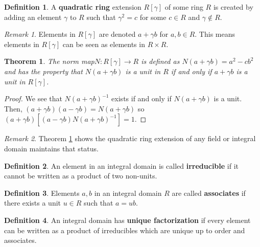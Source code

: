 \documentclass[
    parskip=half,
    toc=flat,
    toc=sectionentrydotfill,
]{scrartcl}  %
\theoremstyle{definition}
\newtheorem{definition}{Definition}[section]
\theoremstyle{plain}
\newtheorem{theorem}{Theorem}[definition]
\theoremstyle{remark}
\newtheorem{remark}{Remark}[definition]
\begin{document}
\begin{definition}
    A \textbf{quadratic ring} extension $R[\gamma]$ of some ring $R$ is created
    by adding an element $\gamma$ to $R$ such that $\gamma^2=c$ for some
    $c\in R$ and $\gamma\notin R$.
\end{definition}

\begin{remark}
    Elements in $R[\gamma]$ are denoted $a+\gamma b$ for $a,b\in R$.
    This means elements in $R[\gamma]$ can be seen as elements in $R\times R$.
\end{remark}

\begin{theorem}
    \label{thm:norm map}
    The norm map\footnotemark $N:R[\gamma]\to R$ is defined as
    $N(a+\gamma b)=a^2-cb^2$ and has the property that $N(a+\gamma b)$ is a
    unit in $R$ if and only if $a+\gamma b$ is a unit in $R[\gamma]$.
\end{theorem}

\begin{proof}
    We see that $N(a+\gamma b)^{-1}$ exists if and only if $N(a+\gamma b)$ is a unit.
    Then, $(a+\gamma b)(a-\gamma b)=N(a+\gamma b)$ so
    $(a+\gamma b)\left[(a-\gamma b)N(a+\gamma b)^{-1}\right]=1$.
\end{proof}

\begin{remark}
    Theorem \ref{thm:norm map} shows the quadratic ring extension of any field
    or integral domain maintains that status.
\end{remark}

\begin{definition}
    An element in an integral domain is called \textbf{irreducible} if it
    cannot be written as a product of two non-units.
\end{definition}

\begin{definition}
    Elements $a,b$ in an integral domain $R$ are called \textbf{associates} if
    there exists a unit $u\in R$ such that $a=ub$.
\end{definition}

\begin{definition}
    \label{def:unique factorization}
    An integral domain has \textbf{unique factorization} if every element can
    be written as a product of irreducibles which are unique up to order and
    associates.
\end{definition}
\end{document}
